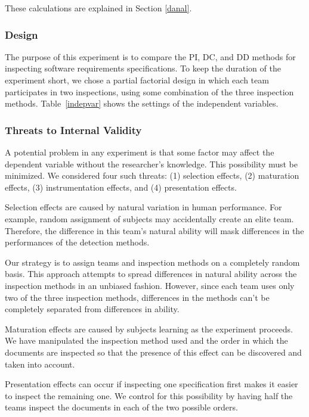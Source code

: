 These calculations are explained in Section \ref{danal}.  

\subsubsection{Design}

The purpose of this experiment is to compare the 
PI, DC, and DD methods for inspecting software 
requirements specifications.  To keep the duration 
of the experiment short,
we chose a partial factorial design in
which each team participates in two inspections, 
using some combination of the three inspection methods.
Table~\ref{indepvar} shows the settings of the independent variables.

\subsubsection{Threats to Internal Validity}\label{sec:teamselec}

A potential problem in any experiment is that some factor may affect 
the 
dependent variable without the researcher's knowledge. This 
possibility must be minimized. We considered four such threats:
(1) selection effects, (2) maturation effects, (3) instrumentation 
effects, and (4) presentation effects.

Selection effects are caused by natural variation in human performance.
For example, random assignment of subjects may accidentally create 
an elite team. Therefore, the difference in this team's natural ability 
will mask differences in the performances of the detection methods.

Our strategy is to assign teams and inspection methods on a completely 
random basis.  This approach attempts to spread differences in natural ability 
across the inspection methods in an unbiased fashion.  However, since each
team uses only two of the three inspection methods, differences in the methods
can't be completely separated from differences in ability.

Maturation effects are caused by subjects learning 
as the experiment proceeds. 
We have manipulated the inspection method used and 
the order in which the documents are inspected so that 
the presence of this effect can be discovered and 
taken into account. 

Presentation effects can occur if inspecting one 
specification first makes it easier to inspect the
remaining one. We control for this possibility by
having half the teams inspect the documents in 
each of the two possible orders.


